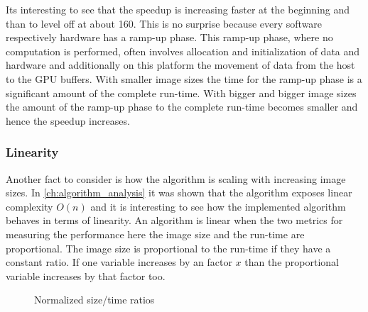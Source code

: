Its interesting to see that the speedup is increasing faster at the beginning
and than to level off at about 160. This is no surprise because every software
respectively hardware has a ramp-up phase. This ramp-up phase, where no
computation is performed, often involves allocation and initialization of data
and hardware and additionally on this platform the movement of data from the
host to the \gls{GPU} buffers. With smaller image sizes the time for the ramp-up
phase is a significant amount of the complete run-time. With bigger and bigger
image sizes the amount of the ramp-up phase to the complete run-time becomes 
smaller and hence the speedup increases. 

\subsubsection{Linearity} %
\label{ssub:linearity}
Another fact to consider is how the algorithm is scaling with increasing image
sizes. In \autoref{ch:algorithm_analysis} it was shown that the algorithm
exposes linear complexity $O(n)$ and it is interesting to see how the
implemented algorithm behaves in terms of linearity. An algorithm is linear when
the two metrics for measuring the performance here the image size and the
run-time are proportional. The image size is proportional to the run-time if 
they have a constant ratio. If one variable increases by an factor $x$ than the
proportional variable increases by that factor too.
\begin{figure}[ht]
  \centering
	

	\tableA

	\caption{Normalized size/time ratios}%
	\label{fig:linearity}
 \end{figure}

